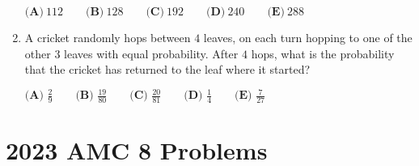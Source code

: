 \documentclass{article}
\begin{document}
\begin{enumerate}[label=\arabic*., itemsep=0.5em]
\(\textbf{(A)} ~112\qquad\textbf{(B)} ~128\qquad\textbf{(C)} ~192\qquad\textbf{(D)} ~240\qquad\textbf{(E)} ~288\)\par \vspace{0.5em}\item A cricket randomly hops between \(4\) leaves, on each turn hopping to one of the other \(3\) leaves with equal probability. After \(4\) hops, what is the probability that the cricket has returned to the leaf where it started?



\(\textbf{(A) }\frac{2}{9}\qquad\textbf{(B) }\frac{19}{80}\qquad\textbf{(C) }\frac{20}{81}\qquad\textbf{(D) }\frac{1}{4}\qquad\textbf{(E) }\frac{7}{27}\)\par \vspace{0.5em}
\end{enumerate}
\newpage\section*{2023 AMC 8 Problems}
\end{document}
